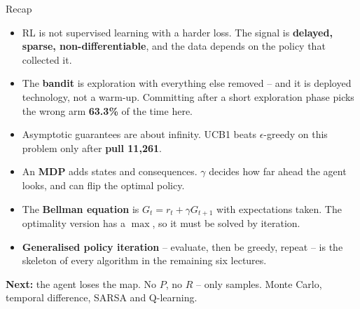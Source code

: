 \documentclass[aspectratio=169]{beamer}
\begin{document}
\begin{frame}{Recap}
  \footnotesize
  \begin{itemize}\itemsep4pt
    \item RL is not supervised learning with a harder loss. The signal is \textbf{delayed,
          sparse, non-differentiable}, and the data depends on the policy that collected it.
    \item The \textbf{bandit} is exploration with everything else removed -- and it is deployed
          technology, not a warm-up. Committing after a short exploration phase picks the wrong
          arm \textbf{63.3\%} of the time here.
    \item Asymptotic guarantees are about infinity. UCB1 beats $\epsilon$-greedy on this
          problem only after \textbf{pull 11{,}261}.
    \item An \textbf{MDP} adds states and consequences. $\gamma$ decides how far ahead the
          agent looks, and can flip the optimal policy.
    \item The \textbf{Bellman equation} is $G_t = r_t + \gamma G_{t+1}$ with expectations
          taken. The optimality version has a $\max$, so it must be solved by iteration.
    \item \textbf{Generalised policy iteration} -- evaluate, then be greedy, repeat -- is the
          skeleton of every algorithm in the remaining six lectures.
  \end{itemize}

  \vskip 6pt
  \begin{tcolorbox}[colback=paramgreen!8, colframe=paramgreen, boxrule=0.6pt, arc=2pt]
    \footnotesize
    \textbf{Next:} the agent loses the map. No $P$, no $R$ -- only samples. Monte Carlo,
    temporal difference, SARSA and Q-learning.
  \end{tcolorbox}
\end{frame}
\end{document}
